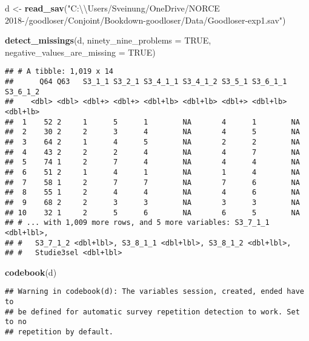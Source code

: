 \documentclass[]{book}
\newenvironment{Shaded}{\begin{snugshade}}{\end{snugshade}}
\newcommand{\KeywordTok}[1]{\textcolor[rgb]{0.13,0.29,0.53}{\textbf{#1}}}
\newcommand{\DataTypeTok}[1]{\textcolor[rgb]{0.13,0.29,0.53}{#1}}
\newcommand{\CharTok}[1]{\textcolor[rgb]{0.31,0.60,0.02}{#1}}
\newcommand{\StringTok}[1]{\textcolor[rgb]{0.31,0.60,0.02}{#1}}
\newcommand{\OtherTok}[1]{\textcolor[rgb]{0.56,0.35,0.01}{#1}}
\newcommand{\NormalTok}[1]{#1}
\begin{document}
\begin{Shaded}
\begin{Highlighting}[]
\NormalTok{d <-}\StringTok{ }\KeywordTok{read_sav}\NormalTok{(}\StringTok{"C:}\CharTok{\textbackslash{}\textbackslash{}}\StringTok{Users/Sveinung/OneDrive/NORCE 2018-/goodloser/Conjoint/Bookdown-goodloser/Data/Goodloser-exp1.sav"}\NormalTok{)}

\KeywordTok{detect_missings}\NormalTok{(d, }\DataTypeTok{ninety_nine_problems =} \OtherTok{TRUE}\NormalTok{, }\DataTypeTok{negative_values_are_missing =} \OtherTok{TRUE}\NormalTok{)}
\end{Highlighting}
\end{Shaded}

\begin{verbatim}
## # A tibble: 1,019 x 14
##      Q64 Q63   S3_1_1 S3_2_1 S3_4_1_1 S3_4_1_2 S3_5_1 S3_6_1_1 S3_6_1_2
##    <dbl> <dbl> <dbl+> <dbl+> <dbl+lb> <dbl+lb> <dbl+> <dbl+lb> <dbl+lb>
##  1    52 2     1      5      1        NA       4      1        NA      
##  2    30 2     2      3      4        NA       4      5        NA      
##  3    64 2     1      4      5        NA       2      2        NA      
##  4    43 2     2      2      4        NA       4      7        NA      
##  5    74 1     2      7      4        NA       4      4        NA      
##  6    51 2     1      4      1        NA       1      4        NA      
##  7    58 1     2      7      7        NA       7      6        NA      
##  8    55 1     2      4      4        NA       4      6        NA      
##  9    68 2     2      3      3        NA       3      3        NA      
## 10    32 1     2      5      6        NA       6      5        NA      
## # ... with 1,009 more rows, and 5 more variables: S3_7_1_1 <dbl+lbl>,
## #   S3_7_1_2 <dbl+lbl>, S3_8_1_1 <dbl+lbl>, S3_8_1_2 <dbl+lbl>,
## #   Studie3sel <dbl+lbl>
\end{verbatim}

\begin{Shaded}
\begin{Highlighting}[]
\KeywordTok{codebook}\NormalTok{(d)}
\end{Highlighting}
\end{Shaded}

\begin{verbatim}
## Warning in codebook(d): The variables session, created, ended have to
## be defined for automatic survey repetition detection to work. Set to no
## repetition by default.
\end{verbatim}
\end{document}
